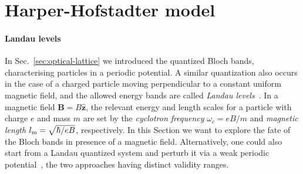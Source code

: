 \section{Harper-Hofstadter model}
\label{sec:hh-atoms}
\paragraph{Landau levels}
In Sec.~\ref{sec:optical-lattice} we introduced the quantized Bloch
bands, characterising particles in a periodic potential. A similar
quantization also occurs in the case of a charged particle moving
perpendicular to a constant uniform magnetic field, and the allowed
energy bands are called \textit{Landau
  levels}~\cite{Landau:101810}. In a magnetic field
$\bm{B} = B \hat{\bm{z}}$, the relevant energy and length scales for a
particle with charge $e$ and mass $m$ are set by the \textit{cyclotron
  frequency} $\omega_c = eB/m$ and \textit{magnetic length}
$l_{\text{m}} = \sqrt{\hbar/eB}$, respectively. In this Section we want to
explore the fate of the Bloch bands in presence of a magnetic
field. Alternatively, one could also start from a Landau quantized
system and perturb it via a weak periodic
potential~\cite{PhysRev.180.633,PhysRevB.46.12606}, the two approaches
having distinct validity ranges.

